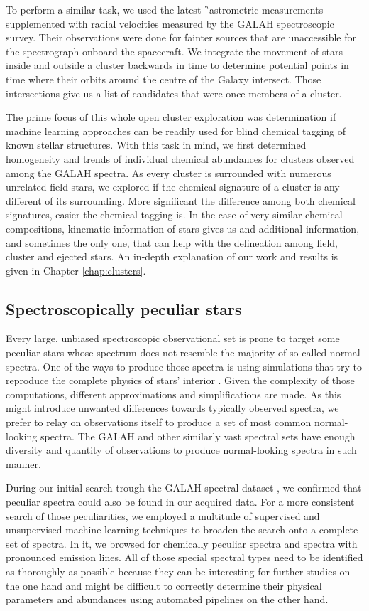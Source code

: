To perform a similar task, we used the latest \G\ astrometric measurements supplemented with radial velocities measured by the GALAH spectroscopic survey. Their observations were done for fainter sources that are unaccessible for the spectrograph onboard the spacecraft. We integrate the movement of stars inside and outside a cluster backwards in time to determine potential points in time where their orbits around the centre of the Galaxy intersect. Those intersections give us a list of candidates that were once members of a cluster.

The prime focus of this whole open cluster exploration was determination if machine learning approaches can be readily used for blind chemical tagging of known stellar structures. With this task in mind, we first determined homogeneity and trends of individual chemical abundances for clusters observed among the GALAH spectra. As every cluster is surrounded with numerous unrelated field stars, we explored if the chemical signature of a cluster is any different of its surrounding. More significant the difference among both chemical signatures, easier the chemical tagging is. In the case of very similar chemical compositions, kinematic information of stars gives us and additional information, and sometimes the only one, that can help with the delineation among field, cluster and ejected stars. An in-depth explanation of our work and results is given in Chapter \ref{chap:clusters}.

\subsection{Spectroscopically peculiar stars}
Every large, unbiased spectroscopic observational set is prone to target some peculiar stars whose spectrum does not resemble the majority of so-called normal spectra. One of the ways to produce those spectra is using simulations that try to reproduce the complete physics of stars' interior \cite{2008A&A...486..951G}. Given the complexity of those computations, different approximations and simplifications are made. As this might introduce unwanted differences towards typically observed spectra, we prefer to relay on observations itself to produce a set of most common normal-looking spectra. The GALAH and other similarly vast spectral sets have enough diversity and quantity of observations to produce normal-looking spectra in such manner.

During our initial search trough the GALAH spectral dataset \cite{2017ApJS..228...24T}, we confirmed that peculiar spectra could also be found in our acquired data. For a more consistent search of those peculiarities, we employed a multitude of supervised and unsupervised machine learning techniques to broaden the search onto a complete set of spectra. In it, we browsed for chemically peculiar spectra and spectra with pronounced emission lines. All of those special spectral types need to be identified as thoroughly as possible because they can be interesting for further studies on the one hand and might be difficult to correctly determine their physical parameters and abundances using automated pipelines on the other hand.

